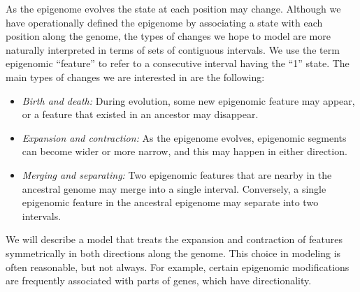 \documentclass[11pt]{article}
\begin{document}
As the epigenome evolves the state at each position may
change. Although we have operationally defined the epigenome by
associating a state with each position along the genome, the types of
changes we hope to model are more naturally interpreted in terms of
sets of contiguous intervals. We use the term epigenomic ``feature''
to refer to a consecutive interval having the ``1'' state. The
main types of changes we are interested in are the following:
\begin{itemize}
\item {\it Birth and death:} During evolution, some new epigenomic
  feature may appear, or a feature that existed in an ancestor may
  disappear. %
\item {\it Expansion and contraction:} As the epigenome evolves,
  epigenomic segments can become wider or more narrow, and this may
  happen in either direction.
\item {\it Merging and separating:} Two epigenomic features that are
  nearby in the ancestral genome may merge into a single interval.
  Conversely, a single epigenomic feature in the ancestral epigenome
  may separate into two intervals.
\end{itemize}
We will describe a model that treats the expansion and contraction of
features symmetrically in both directions along the genome.  This
choice in modeling is often reasonable, but not always. For example,
certain epigenomic modifications are frequently associated with parts
of genes, which have directionality.
\end{document}
